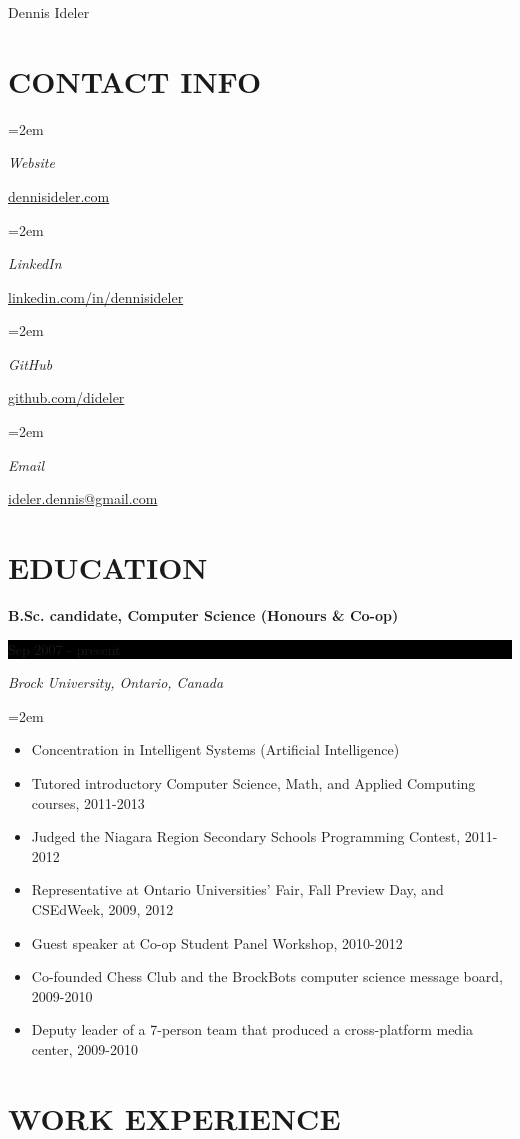 \documentclass[paper=a4,fontsize=11pt]{scrartcl} %
\newlength{\spacebox}
\newcommand{\sepspace}{\vspace*{1em}}		%
\newcommand{\MyName}[1]{ %
		\Huge \usefont{OT1}{phv}{b}{n} \hfill #1
		\par \normalsize \normalfont}
\newcommand{\MySlogan}[1]{ %
		\large \usefont{OT1}{phv}{m}{n}\hfill \textit{#1}
		\par \normalsize \normalfont}
\newcommand{\NewPart}[1]{\section*{\uppercase{#1}}}
\newcommand{\PersonalEntry}[2]{
		\noindent\hangindent=2em\hangafter=0 %
		\parbox{\spacebox}{        %
		\textit{#1}}		       %
		\hspace{1.5em} #2 \par}    %
\newcommand{\EducationEntry}[4]{
		\noindent \textbf{#1} \hfill      %
		\colorbox{Black}{%
			\parbox{8.0em}{%
			\hfill\color{White}#2}} \par  %
		\noindent \textit{#3} \par        %
		\noindent\hangindent=2em\hangafter=0 \small #4 %
		\normalsize \par}
\begin{document}

\MyName{Dennis Ideler} %

\sepspace

\NewPart{Contact Info}{}

\PersonalEntry{Website}{\url{dennisideler.com}}
\PersonalEntry{LinkedIn}{\url{linkedin.com/in/dennisideler}}
\PersonalEntry{GitHub}{\url{github.com/dideler}}
\PersonalEntry{Email}{\url{ideler.dennis@gmail.com}}

\NewPart{Education}{}

\EducationEntry{B.Sc. candidate, Computer Science (Honours \& Co-op)}
{Sep 2007 - present}
{Brock University, Ontario, Canada}
{
 \begin{itemize}  \itemsep -1pt %
   \item Concentration in Intelligent Systems (Artificial Intelligence)
   \item Tutored introductory Computer Science, Math, and Applied Computing courses, 2011-2013
   \item Judged the Niagara Region Secondary Schools Programming Contest, 2011-2012
   \item Representative at Ontario Universities' Fair, Fall Preview Day,
   and CSEdWeek, 2009, 2012
   \item Guest speaker at Co-op Student Panel Workshop, 2010-2012
   \item Co-founded Chess Club and the BrockBots computer science
   message board, 2009-2010
   \item Deputy leader of a 7-person team that produced a cross-platform media center, 2009-2010
 \end{itemize}
}

\NewPart{Work experience}{}

\end{document}
